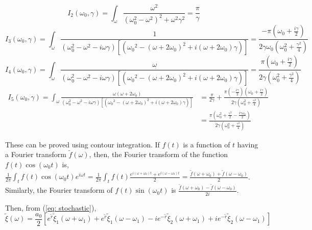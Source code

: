 \documentclass[12pt, twoside]{article}
\begin{document}
\begin{equation}
I_2(\omega_0,\gamma) = \int_{\omega} \frac{\omega^2}{(\omega_0^2 - \omega^2)^2 + \omega^2 \gamma^2} = \frac{\pi}{\gamma}
\end{equation} 
\begin{equation}
I_3(\omega_0,\gamma) = \int_{\omega} \frac{1}{(\omega_0^2 - \omega^2 - i\omega\gamma) [({\omega_0}^2 - (\omega + 2\omega_0)^2 + i(\omega + 2 \omega_0) \gamma)]} = \frac{-\pi(\omega_0 + \frac{i\gamma}{2})}{2\gamma\omega_0(\omega_0^2 + \frac{\gamma^2}{4})}
\end{equation}
\begin{equation}
I_4(\omega_0,\gamma) = \int_{\omega} \frac{\omega}{(\omega_0^2 - \omega^2 - i\omega\gamma) [({\omega_0}^2 - (\omega + 2\omega_0)^2 + i(\omega + 2 \omega_0) \gamma)]} = \frac{\pi(\omega_0 + \frac{i\gamma}{2})}{2\gamma(\omega_0^2 + \frac{\gamma^2}{4})}
\end{equation}
\begin{equation}\begin{aligned}
I_5(\omega_0,\gamma) = \int_{\omega} \frac{\omega (\omega + 2\omega_0)}{(\omega_0^2 - \omega^2 - i\omega\gamma) [({\omega_0}^2 - (\omega + 2\omega_0)^2 + i(\omega + 2 \omega_0) \gamma)]} &= \frac{\pi}{2\gamma} + \frac{\pi(-\frac{i\gamma}{2})(\omega_0 + \frac{i\gamma}{2})}{2\gamma(\omega_0^2 + \frac{\gamma^2}{4})} \\&= \frac{\pi(\omega_0^2 + \frac{\gamma^2}{2} -\frac{i\gamma\omega_0}{2})}{2\gamma(\omega_0^2 + \frac{\gamma^2}{4})}\end{aligned}
\end{equation}

These can be proved using contour integration. If $f(t)$ is a function of $t$ having a Fourier transform $\widetilde{f}(\omega)$, then, the Fourier transform of the function $f(t)\cos(\omega_0 t)$ is, $\frac{1}{2\pi} \int_{t} f(t) \cos(\omega_0 t) e^{i\omega t} = \frac{1}{2\pi} \int_{t} f(t) \frac{e^{i(\omega+\omega_0) t} + e^{i(\omega-\omega_0) t}}{2} = \frac{\widetilde{f}(\omega + \omega_0) + \widetilde{f}(\omega - \omega_0)}{2}$. Similarly, the Fourier transform of $f(t)\sin(\omega_0 t)$ is $\frac{\widetilde{f}(\omega + \omega_0) - \widetilde{f}(\omega - \omega_0)}{2i}$.

Then, from (\ref{eq: stochastic}),
\begin{equation}\label{eq:fourier_stochastic}
	\widetilde{\xi}(\omega) = \frac{a_0}{2} [e^{\tilde{r}} \widetilde{\xi}_1 (\omega + \omega_1) + e^{\tilde{r}} \widetilde{\xi}_1 (\omega - \omega_1) - i e^{-{\tilde{r}}} \widetilde{\xi}_2 (\omega + \omega_1) +  i e^{-{\tilde{r}}} \widetilde{\xi}_2 (\omega - \omega_1)]
\end{equation}
\end{document}
